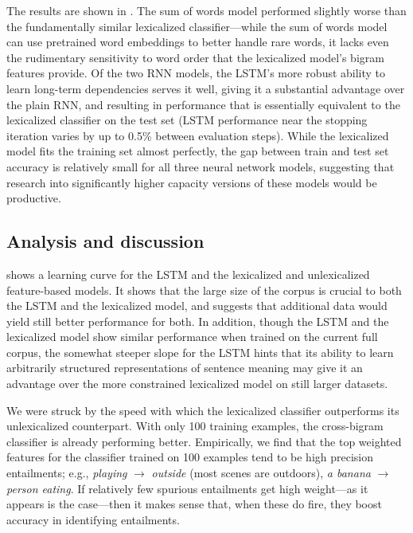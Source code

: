 The results are shown in . The sum of words model performed slightly worse than the fundamentally similar lexicalized classifier---while the sum of words model can use pretrained word embeddings to better handle rare words, it lacks even the rudimentary sensitivity to word order that the lexicalized model's bigram features provide. Of the two RNN models, the LSTM's more robust ability to learn long-term dependencies serves it well, giving it a substantial advantage over the plain RNN, and  resulting in performance that is essentially equivalent to the lexicalized classifier on the test set (LSTM performance near the stopping iteration varies by up to 0.5\% between evaluation steps). While the lexicalized model fits the training set almost perfectly, the gap between train and test set accuracy is relatively small for all three neural network models, suggesting that research into significantly higher capacity versions of these models would be productive.

\subsection{Analysis and discussion}

 shows a learning curve for the LSTM and the lexicalized and unlexicalized feature-based models. It shows that the large size of the corpus is crucial to both the LSTM and the lexicalized model, and suggests that additional data would yield still better performance for both. In addition, though the LSTM and the lexicalized model show similar performance when trained on the current full corpus, the somewhat steeper slope for the LSTM hints that its ability to learn arbitrarily structured representations of sentence meaning may give it an advantage over the more constrained lexicalized model on still larger datasets.



We were struck by the speed with which the lexicalized classifier outperforms its unlexicalized counterpart.
With only 100 training examples, the cross-bigram classifier is already performing better.
Empirically, we find that the top weighted features for the classifier
  trained on 100 examples tend to be high precision entailments;
  e.g.,
  \textit{playing} $\rightarrow$ \textit{outside}
  (most scenes are outdoors), \textit{a banana} $\rightarrow$
  \textit{person eating}.
If relatively few spurious entailments get high weight---as it appears
is the case---then it makes sense that, when these do fire, they
boost accuracy in identifying entailments.
  
